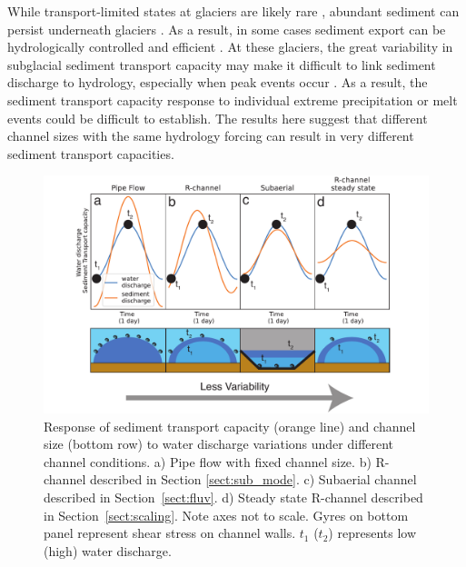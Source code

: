 \documentclass[esurf, manuscript]{copernicus}
\begin{document}
While transport-limited states at glaciers are likely rare \citep[e.g.][]{alley1997}, abundant sediment can persist underneath glaciers \citep[e.g.][]{walter2014,stevens2022,delaney2022}.
As a result, in some cases sediment export can be hydrologically controlled and efficient \citep[e.g.][]{swift2005,andresen2024}.
At these glaciers, the great variability in subglacial sediment transport capacity may make it difficult to link sediment discharge to hydrology, especially when peak events occur \citep{cowan1988,delaney2018,lu2022}.
As a result, the sediment transport capacity response to individual extreme precipitation or melt events could be difficult to establish.
The results here suggest that different channel sizes with the same hydrology forcing can result in very different sediment transport capacities. 

\begin{figure}[hbt!]
  \centering
  \includegraphics[width=\linewidth]{Fig7.pdf}
  \caption{Response of sediment transport capacity (orange line) and channel size (bottom row) to water discharge variations under different channel conditions.
    a) Pipe flow with fixed channel size.
    b) R-channel described in Section \ref{sect:sub_mode}.
    c) Subaerial channel described in Section~\ref{sect:fluv}.
    d) Steady state R-channel described in Section~\ref{sect:scaling}.
    Note axes not to scale.
    Gyres on bottom panel represent shear stress on channel walls.
    $t_1$ ($t_2$) represents low (high) water discharge. 
  }
  \label{fig:chan_types}
\end{figure}
\end{document}
